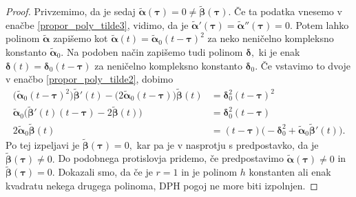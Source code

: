 \documentclass[12pt,a4paper,twoside]{article}
\theoremstyle{definition} %
\theoremstyle{plain} %
\theoremstyle{primerstyle}
\numberwithin{equation}{section}  %
\newcommand{\bdelta}{\boldsymbol \delta}
\newcommand{\btau}{\boldsymbol \tau}
\newcommand{\btalpha}{\tilde{\boldsymbol \alpha}}
\newcommand{\btbeta}{\tilde{\boldsymbol \beta}}
\begin{document}
\begin{proof}
	Privzemimo, da je sedaj $\btalpha(\btau)=0\neq\btbeta(\btau).$ Če ta podatka vnesemo v enačbe \eqref{propor_poly_tilde3}, vidimo, da je $\btalpha'(\btau)=\btalpha''(\btau)=0.$ Potem lahko polinom $\btalpha$ zapišemo kot $\btalpha(t)=\btalpha_0(t-\btau)^2$ za neko neničelno kompleksno konstanto $\btalpha_0.$ Na podoben način zapišemo tudi polinom $\bdelta,$ ki je enak $\bdelta(t)=\bdelta_0(t-\btau)$ za neničelno kompleksno konstanto $\bdelta_0.$ Če vstavimo to dvoje v enačbo \eqref{propor_poly_tilde2}, dobimo
	\begin{align*}
		\big(\btalpha_0(t-\btau)^2\big)\btbeta'(t)-\big(2\btalpha_0(t-\btau)\big)\btbeta(t)&=\bdelta_0^2(t-\btau)^2\\
		\btalpha_0\big(\btbeta'(t)(t-\btau)-2\btbeta(t)\big)&=\bdelta_0^2(t-\btau)\\
		2\btalpha_0\btbeta(t)&=(t-\btau)\big(-\bdelta_0^2+\btalpha_0\btbeta'(t)\big).
	\end{align*}
	Po tej izpeljavi je $\btbeta(\btau)=0,$ kar pa je v nasprotju s predpostavko, da je $\btbeta(\btau)\neq0.$ Do podobnega protislovja pridemo, če predpostavimo $\btalpha(\btau)\neq0$ in $\btbeta(\btau)=0.$ Dokazali smo, da če je $r=1$ in je polinom $h$ konstanten ali enak kvadratu nekega drugega polinoma, DPH pogoj ne more biti izpolnjen.
\end{proof}
\end{document}

